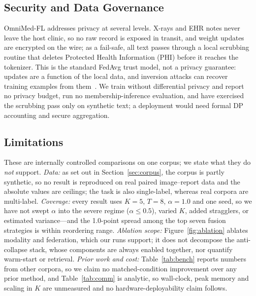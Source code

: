 \documentclass[letterpaper, conference]{IEEEtran}
\begin{document}
\subsection{Security and Data Governance}
OmniMed-FL addresses privacy at several levels. X-rays and EHR notes never leave
the host clinic, so no raw record is exposed in transit, and weight updates are
encrypted on the wire; as a fail-safe, all text passes through a local scrubbing
routine that deletes Protected Health Information (PHI) before it reaches the
tokenizer. This is the standard FedAvg trust model, not a privacy guarantee:
updates are a function of the local data, and inversion attacks can recover
training examples from them~\cite{Abadi2016}. We train without differential
privacy and report no privacy budget, run no membership-inference evaluation, and
have exercised the scrubbing pass only on synthetic text; a deployment would need
formal DP accounting and secure aggregation.




\subsection{Limitations}
\label{sec:limits}
These are internally controlled comparisons on one corpus; we state what they do
\emph{not} support. \textit{Data:} as set out in Section~\ref{sec:corpus}, the
corpus is partly synthetic, so no result is reproduced on real paired
image--report data and the absolute values are ceilings; the task is also
single-label, whereas real corpora are multi-label. \textit{Coverage:} every
result uses $K{=}5$, $T{=}8$, $\alpha{=}1.0$ and one seed, so we have not swept
$\alpha$ into the severe regime ($\alpha\!\leq\!0.5$), varied $K$, added
stragglers, or estimated variance---and the 1.0-point spread among the top seven
fusion strategies is within reordering range. \textit{Ablation scope:}
Figure~\ref{fig:ablation} ablates modality and federation, which our runs
support; it does not decompose the anti-collapse stack, whose components are
always enabled together, nor quantify warm-start or retrieval. \textit{Prior work
and cost:} Table~\ref{tab:bench} reports numbers from other corpora, so we claim
no matched-condition improvement over any prior method, and
Table~\ref{tab:comm} is analytic, so wall-clock, peak memory and scaling in $K$
are unmeasured and no hardware-deployability claim follows.
\end{document}
